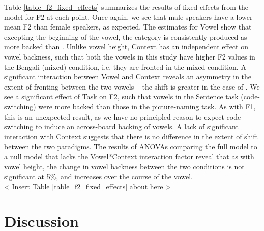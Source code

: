 \documentclass[12 pt]{article}
\newcommand{\nt}[1]{\textipa{[#1]}} %
\begin{document}
Table \ref{table_f2_fixed_effects} summarizes the results of fixed effects from the model for F2 at each point. Once again, we see that male speakers have a lower mean F2 than female speakers, as expected. The estimates for Vowel show that excepting the beginning of the vowel, the category \nt{2} is consistently produced as more backed than \nt{\ae}. Unlike vowel height, Context has an independent effect on vowel backness, such that both the vowels in this study have higher F2 values in the Bengali (mixed) condition, i.e. they are fronted in the mixed condition. A significant interaction between Vowel and Context reveals an asymmetry in the extent of fronting between the two vowels -- the shift is greater in the case of \nt{\ae}. We see a significant effect of Task on F2, such that vowels in the Sentence task (code-switching) were more backed than those in the picture-naming task. As with F1, this is an unexpected result, as we have no principled reason to expect code-switching to induce an across-board backing of vowels. A lack of significant interaction with Context suggests that there is no difference in the extent of shift between the two paradigms. The results of ANOVAs comparing the full model to a null model that lacks the Vowel*Context interaction factor reveal that as with vowel height, the change in vowel backness between the two conditions is not significant at 5\%, and increases over the course of the vowel.\\

< Insert Table \ref{table_f2_fixed_effects} about here >



\section{Discussion}
\end{document}
